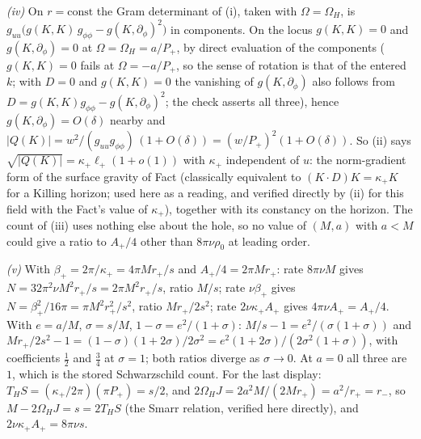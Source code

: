 \emph{(iv)} On $r = \mathrm{const}$ the Gram determinant of (i), taken with $\Omega = \Omega_H$, is $g_{uu}\bigl(g(K,K)\,g_{\phi\phi} - g(K,\partial_\phi)^2\bigr)$ in components. On the locus $g(K,K) = 0$ and $g(K, \partial_\phi) = 0$ at $\Omega = \Omega_H = a/P_+$, by direct evaluation of the components ($g(K,K) = 0$ fails at $\Omega = -a/P_+$, so the sense of rotation is that of the entered $k$; with $D = 0$ and $g(K,K) = 0$ the vanishing of $g(K,\partial_\phi)$ also follows from $D = g(K,K)g_{\phi\phi} - g(K,\partial_\phi)^2$; the check asserts all three), hence $g(K,\partial_\phi) = O(\delta)$ nearby and $|Q(K)| = w^2/(g_{uu}g_{\phi\phi})\,(1 + O(\delta)) = (w/P_+)^2(1 + O(\delta))$. So (ii) says $\sqrt{|Q(K)|} = \kappa_+\ell_+(1 + o(1))$ with $\kappa_+$ independent of $u$: the norm-gradient form of the surface gravity of Fact  (classically equivalent to $(K\cdot D)K = \kappa_+K$ for a Killing horizon; used here as a reading, and verified directly by (ii) for this field with the Fact's value of $\kappa_+$), together with its constancy on the horizon. The count of (iii) uses nothing else about the hole, so no value of $(M, a)$ with $a < M$ could give a ratio to $A_+/4$ other than $8\pi\nu\rho_0$ at leading order.

\emph{(v)} With $\beta_+ = 2\pi/\kappa_+ = 4\pi Mr_+/s$ and $A_+/4 = 2\pi Mr_+$: rate $8\pi\nu M$ gives $N = 32\pi^2\nu M^2r_+/s = 2\pi M^2r_+/s$, ratio $M/s$; rate $\nu\beta_+$ gives $N = \beta_+^2/16\pi = \pi M^2r_+^2/s^2$, ratio $Mr_+/2s^2$; rate $2\nu\kappa_+A_+$ gives $4\pi\nu A_+ = A_+/4$. With $e = a/M$, $\sigma = s/M$, $1 - \sigma = e^2/(1+\sigma)$: $M/s - 1 = e^2/(\sigma(1+\sigma))$ and $Mr_+/2s^2 - 1 = (1-\sigma)(1+2\sigma)/2\sigma^2 = e^2(1+2\sigma)/(2\sigma^2(1+\sigma))$, with coefficients $\tfrac12$ and $\tfrac34$ at $\sigma = 1$; both ratios diverge as $\sigma \to 0$. At $a = 0$ all three are $1$, which is the stored Schwarzschild count. For the last display: $T_HS = (\kappa_+/2\pi)(\pi P_+) = s/2$, and $2\Omega_HJ = 2a^2M/(2Mr_+) = a^2/r_+ = r_-$, so $M - 2\Omega_HJ = s = 2T_HS$ (the Smarr relation, verified here directly), and $2\nu\kappa_+A_+ = 8\pi\nu s$.

